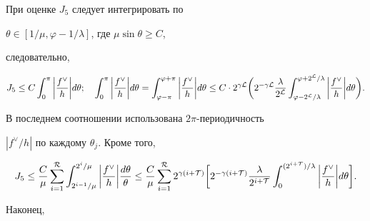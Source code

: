 При оценке $J_5$ следует интегрировать по 


$\theta\in[1/\mu,\varphi-1/\lambda]$, где $\mu\sin\theta\ge C$, 


следовательно, 


\begin{equation} 


J_5\le C\int^\pi_0\bigg|\frac{f^\vee}{h}\bigg|d\theta;\quad 


\int^\pi_0\bigg|\frac{f^\vee}{h}\bigg|d\theta= 


\int^{\varphi+\pi}_{\varphi-\pi} 


\bigg|\frac{f^\vee}{h}\bigg|d\theta\le C\cdot 2^{\gamma\cal L} 


\bigg(2^{-\gamma\cal L}\frac{\lambda}{2^{\cal L}} 


\int^{\varphi+2^{\cal L}/\lambda}_{\varphi-2^{\cal L}/\lambda} 


\bigg|\frac{f^\vee}{h}\bigg|d\theta\bigg). 


\end{equation} 


В последнем соотношении использована $2\pi$-периодичность 


$|f^\vee/h|$ по каждому $\theta_j$. Кроме того, 


\begin{equation} 


J_5\le \frac{C}{\mu}\sum^{\cal R}_{i=1} 


\int^{2^i/\mu}_{2^{i-1}/\mu} 


\bigg|\frac{f^\vee}{h}\bigg| 


\frac{d\theta}{\theta}\le\frac{C}{\mu} 


\sum^{\cal R}_{i=1} 


2^{\gamma(i+\cal T)}\bigg[ 


2^{-\gamma(i+\cal T)} 


\frac{\lambda}{2^{i+\cal T}} 


\int^{(2^{i+\cal T})/\lambda}_0


\bigg|\frac{f^\vee}{h}\bigg|d\theta\bigg].


\end{equation} 


Наконец, 


